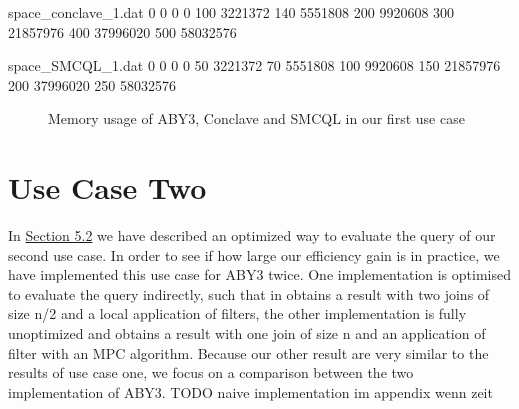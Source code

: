 \begin{filecontents}{space_conclave_1.dat}
	0 0
	0 0
	100 3221372
	140 5551808
	200 9920608
	300 21857976
	400 37996020
	500 58032576
\end{filecontents}
\begin{filecontents}{space_SMCQL_1.dat}
	0 0
	0 0
	50 3221372
	70 5551808
	100 9920608
	150 21857976
	200 37996020
	250 58032576
\end{filecontents}
\begin{figure}[H]
	\caption{Memory usage of ABY3, Conclave and SMCQL in our first use case}
\end{figure}
\section{Use Case Two} 
In \hyperref[use_case2]{Section 5.2} we have described an optimized way to evaluate the query of our second use case. In order to see if how large our efficiency gain is in practice, we have implemented this use case for ABY3 twice. One implementation is optimised to evaluate the query indirectly, such that in obtains a result with two joins of size n/2 and a local application of filters, the other implementation is fully unoptimized and obtains a result with one join of size n and  an application of filter with an MPC algorithm. Because our other result are very similar to the results of use case one, we focus on a comparison between the two implementation of ABY3.  TODO naive implementation im appendix wenn zeit
